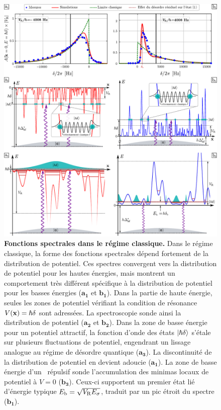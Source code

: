 \begin{figure}
\centering
\includegraphics[width=\textwidth]{Fig/TauS_NJP/fonctions_spectrales_classiques.pdf}
\caption{\textbf{Fonctions spectrales dans le régime classique.} Dans le régime classique, la forme des fonctions spectrales dépend fortement de la distribution de potentiel. Ces spectres convergent vers la distribution de potentiel pour les hautes énergies, mais montrent un comportement très différent spécifique à la distribution de potentiel pour les basses énergies ($\mathbf{a_1}$ et $\mathbf{b_1}$). Dans la partie de haute énergie, seules les zones de potentiel vérifiant la condition de résonance $V(\mathbf{x})=\hslash\delta$ sont adressées. La spectroscopie sonde ainsi la distribution de potentiel ($\mathbf{a_2}$ et $\mathbf{b_2}$). Dans la zone de basse énergie pour un potentiel attractif, la fonction d'onde des états $\left| \hslash\delta \right\rangle$ s'étale sur plusieurs fluctuations de potentiel, engendrant un lissage analogue au régime de désordre quantique ($\mathbf{a_3}$). La discontinuité de la distribution de potentiel en devient adoucie ($\mathbf{a_1}$). La zone de basse énergie d'un \speckle\ répulsif sonde l'accumulation des minimas locaux de potentiel à $V=0$ ($\mathbf{b_3}$). Ceux-ci supportent un premier état lié d'énergie typique $E_{\mathrm{b}}=\sqrt{V_{\mathrm{R}}E_{\sigma}}$, traduit par un pic étroit du spectre ($\mathbf{b_1}$).}
\label{fig:fonctions_spectrales_classiques}
\end{figure}

